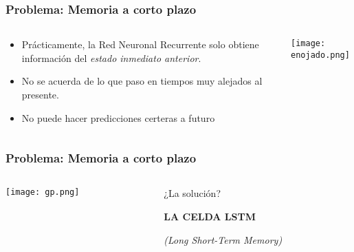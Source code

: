 \begin{frame}
	\frametitle{Problema: \textbf{Memoria a corto plazo}}
	
	\begin{columns}
		\begin{column}{0.5\textwidth}
			\begin{itemize}
				\item Prácticamente, la Red Neuronal Recurrente solo obtiene información del \textit{estado inmediato anterior}.
				\item No se acuerda de lo que paso en tiempos muy alejados al presente.
				\item No puede hacer predicciones certeras a futuro
			\end{itemize}
		\end{column}
		\begin{column}{0.5\textwidth}
			\begin{center}
				\texttt{[image: enojado.png]}
			\end{center}
		\end{column}
	\end{columns}
\end{frame}


\begin{frame}
	\frametitle{Problema: \textbf{Memoria a corto plazo}}
	
	\begin{columns}
		\begin{column}{0.5\textwidth}
			\begin{center}
				\texttt{[image: gp.png]}
			\end{center}
		\end{column}
		\begin{column}{0.5\textwidth}
			\begin{center}
				¿La solución?
				
				\textbf{LA CELDA LSTM}
				
				\textit{(Long Short-Term Memory)}
			\end{center}
		\end{column}
	\end{columns}
\end{frame}


